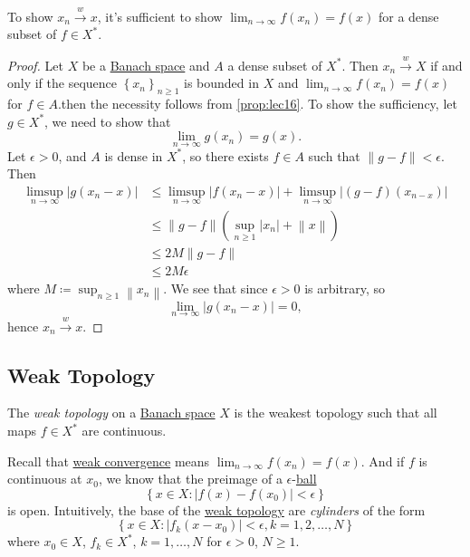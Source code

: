 \begin{lemma}
	To show \(x_n \overset{w}{\to } x\), it's sufficient to show \(\lim_{n \to \infty} f(x_n) = f(x)\) for a dense subset of \(f\in X^{\ast} \).
\end{lemma}
\begin{proof}
	Let \(X\) be a \hyperref[def:Banach-space]{Banach space} and \(A\) a dense subset of \(X^{\ast} \). Then \(x_n\overset{w}{\to }X \) if and only if the sequence \(\left\{ x_n \right\} _{n\geq 1}\) is bounded in \(X\) and \(\lim_{n \to \infty} f(x_n) = f(x)\) for \(f\in A\).then the necessity follows from \autoref{prop:lec16}. To show the sufficiency, let \(g\in X^{\ast} \), we need to show that
	\[
		\lim_{n \to \infty} g(x_n) = g(x).
	\]
	Let \(\epsilon > 0\), and \(A\) is dense in \(X^{\ast} \), so there exists \(f\in A\) such that \(\left\lVert g-f\right\rVert < \epsilon \). Then
	\[
		\begin{split}
			\limsup_{n \to \infty} \left\vert g(x_n - x) \right\vert
			&\leq \limsup_{n \to \infty} \left\vert f(x_n - x) \right\vert + \limsup_{n \to \infty} \left\vert (g-f)(x_{n-x} ) \right\vert \\
			&\leq \left\lVert g-f\right\rVert \left( \sup _{n\geq 1} \left\vert x_n \right\vert + \left\lVert x\right\rVert  \right) \\
			&\leq 2M\left\lVert g-f\right\rVert\\
			&\leq 2M\epsilon
		\end{split}
	\]
	where \(M\coloneqq \sup _{n\geq 1} \left\lVert x_n\right\rVert \). We see that since \(\epsilon > 0\) is arbitrary, so
	\[
		\lim_{n \to \infty} \left\vert g(x_{n} - x ) \right\vert = 0,
	\]
	hence \(x_n \overset{w}{\to} x\).
\end{proof}

\subsection{Weak Topology}
\begin{definition}\label{def:weak-topology}
	The \emph{weak topology} on a \hyperref[def:Banach-space]{Banach space} \(X\) is the weakest topology such that all maps \(f\in X^{\ast} \) are continuous.
\end{definition}

Recall that \hyperref[def:weakly-convergence]{weak convergence} means \(\lim_{n \to \infty} f(x_n) = f(x)\). And if \(f\) is continuous at \(x_0\), we know that the preimage of a \(\epsilon \)-\hyperref[def:ball]{ball}
\[
	\left\{ x\in X\colon \left\vert f(x) - f(x_0) \right\vert < \epsilon  \right\}
\]
is open. Intuitively, the base of the \hyperref[def:weak-topology]{weak topology} are \emph{cylinders} of the form
\[
	\left\{ x\in X\colon \left\vert f_k(x - x_0) \right\vert < \epsilon , k = 1, 2, \ldots , N \right\}
\]
where \(x_0\in X\), \(f_k\in X^{\ast} \), \(k = 1, \ldots  , N\) for \(\epsilon > 0\), \(N \geq 1\).

